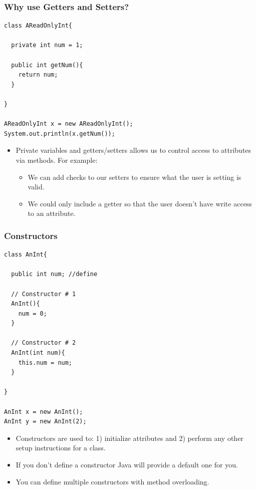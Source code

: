 \documentclass{beamer}
\begin{document}
\begin{frame}[fragile]
    \frametitle{Why use Getters and Setters?}
    \begin{minipage}{0.49\textwidth}
        \begin{lstlisting}[basicstyle=\tiny, frame=trBL]
class AReadOnlyInt{
    
  private int num = 1;
    
  public int getNum(){
    return num;
  }

}

AReadOnlyInt x = new AReadOnlyInt();
System.out.println(x.getNum()); 
        \end{lstlisting}
    \end{minipage}
    \begin{minipage}{0.49\textwidth}
        \begin{itemize}
            \item Private variables and getters/setters allows us to control access to attributes via methods. For example:
            \begin{itemize}
                \item We can add checks to our setters to ensure what the user is setting is valid.
                \item We could only include a getter so that the user doesn't have write access to an attribute. 
            \end{itemize}
        \end{itemize}
    \end{minipage}
\end{frame}

\begin{frame}[fragile]
    \frametitle{Constructors}
    \begin{minipage}{0.49\textwidth}
        \begin{lstlisting}[basicstyle=\tiny, frame=trBL]
class AnInt{
    
  public int num; //define
  
  // Constructor # 1
  AnInt(){
    num = 0;
  }

  // Constructor # 2
  AnInt(int num){
    this.num = num;
  }

}

AnInt x = new AnInt(); 
AnInt y = new AnInt(2); 
        \end{lstlisting}
    \end{minipage}
    \begin{minipage}{0.49\textwidth}
        \begin{itemize}
            \item Constructors are used to: 1) initialize attributes and 2) perform any other setup instructions for a class.
                \pause
            \item If you don't define a constructor Java will provide a default one for you.
                \pause
            \item You can define multiple constructors with method overloading.
        \end{itemize}
    \end{minipage}
\end{frame}
\end{document}
